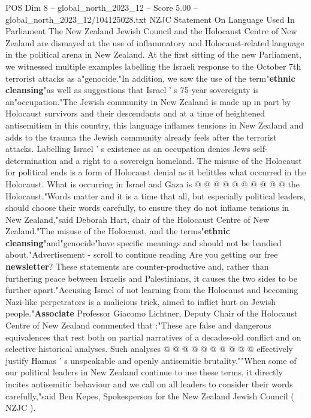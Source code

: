 \begin{textsample}{POS Dim 8 – global\_north\_2023\_12 – Score 5.00 – global\_north\_2023\_12/104125028.txt}  \label{ex:f8_pos_271}
NZJC Statement On Language Used In Parliament The New Zealand Jewish Council and the Holocaust Centre of New Zealand are dismayed at the use of inflammatory and Holocaust-related language in the political arena in New Zealand.
At the first sitting of the new Parliament, we witnessed multiple examples labelling the Israeli response to the October 7th terrorist attacks as a"genocide."In addition, we saw the use of the term"\textbf{ethnic} \textbf{cleansing}"as well as suggestions that Israel ' s 75-year sovereignty is an"occupation."The Jewish community in New Zealand is made up in part by Holocaust survivors and their descendants and at a time of heightened antisemitism in this country, this language inflames tensions in New Zealand and adds to the trauma the Jewish community already feels after the terrorist attacks.
Labelling Israel ' s existence as an occupation denies Jews self-determination and a right to a sovereign homeland.
The misuse of the Holocaust for political ends is a form of Holocaust denial as it belittles what occurred in the Holocaust.
What is occurring in Israel and Gaza is @ @ @ @ @ @ @ @ @ @ the Holocaust."Words matter and it is a time that all, but especially political leaders, should choose their words carefully, to ensure they do not inflame tensions in New Zealand,"said Deborah Hart, chair of the Holocaust Centre of New Zealand."The misuse of the Holocaust, and the terms"\textbf{ethnic} \textbf{cleansing}"and"genocide"have specific meanings and should not be bandied about."Advertisement - scroll to continue reading Are you getting our free \textbf{newsletter}?
These statements are counter-productive and, rather than furthering peace between Israelis and Palestinians, it causes the two sides to be further apart."Accusing Israel of not learning from the Holocaust and becoming Nazi-like perpetrators is a malicious trick, aimed to inflict hurt on Jewish people."\textbf{Associate} Professor Giacomo Lichtner, Deputy Chair of the Holocaust Centre of New Zealand commented that :"These are false and dangerous equivalences that rest both on partial narratives of a decades-old conflict and on selective historical analyses.
Such analyses @ @ @ @ @ @ @ @ @ @ effectively justify Hamas ' s unspeakable and openly antisemitic brutality.""When some of our political leaders in New Zealand continue to use these terms, it directly incites antisemitic behaviour and we call on all leaders to consider their words carefully,"said Ben Kepes, Spokesperson for the New Zealand Jewish Council ( NZJC ).

\end{textsample}
